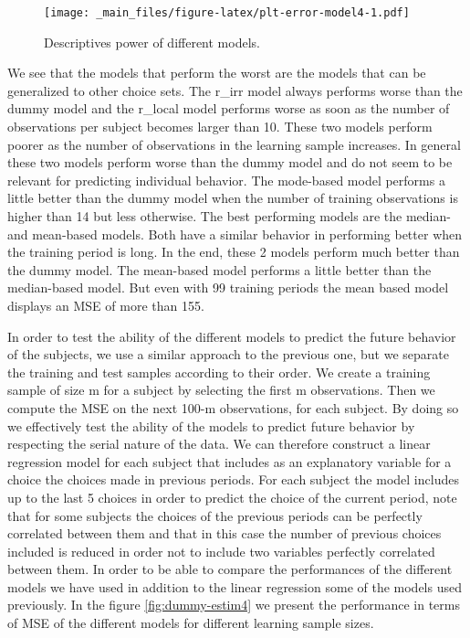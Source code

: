 \documentclass[
]{book}
\begin{document}
\begin{figure}
\centering
\texttt{[image: \_main\_files/figure-latex/plt-error-model4-1.pdf]}
\caption{\label{fig:plt-error-model4}Descriptives power of different models.}
\end{figure}

We see that the models that perform the worst are the models that can be
generalized to other choice sets. The r\_irr model always performs worse
than the dummy model and the r\_local model performs worse as soon as the
number of observations per subject becomes larger than 10. These two
models perform poorer as the number of observations in the learning
sample increases. In general these two models perform worse than the
dummy model and do not seem to be relevant for predicting individual
behavior. The mode-based model performs a little better than the dummy
model when the number of training observations is higher than 14 but
less otherwise. The best performing models are the median- and mean-based
models. Both have a similar behavior in performing better when the
training period is long. In the end, these 2 models perform much better
than the dummy model. The mean-based model performs a little better than
the median-based model. But even with 99 training periods the mean based
model displays an MSE of more than 155.

In order to test the ability of the different models to predict the
future behavior of the subjects, we use a similar approach to the
previous one, but we separate the training and test samples according to
their order. We create a training sample of size m for a subject by
selecting the first m observations. Then we compute the MSE on the next
100-m observations, for each subject. By doing so we effectively test
the ability of the models to predict future behavior by respecting the
serial nature of the data. We can therefore construct a linear regression
model for each subject that includes as an explanatory variable for a
choice the choices made in previous periods. For each subject the model
includes up to the last 5 choices in order to predict the choice of the
current period, note that for some subjects the choices of the previous
periods can be perfectly correlated between them and that in this case
the number of previous choices included is reduced in order not to
include two variables perfectly correlated between them. In order to be
able to compare the performances of the different models we have used in
addition to the linear regression some of the models used previously. In
the figure \ref{fig:dummy-estim4} we present the performance in terms of MSE of
the different models for different learning sample sizes.
\end{document}
